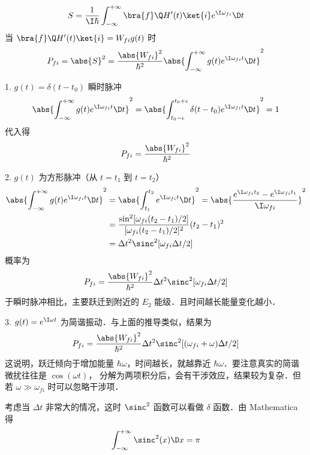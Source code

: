 
\begin{equation}
S = \frac{1}{\I\hbar} \int_{-\infty}^{+\infty} \bra{f}\Q H'(t)\ket{i} e^{\I\omega_{fi}} \D t
\end{equation}
当 $\bra{f}\Q H'(t)\ket{i} = W_{fi} g(t)$ 时
\begin{equation}
P_{fi} = \abs{S}^2 = \frac{\abs{W_{fi}}^2}{\hbar^2} \abs{\int_{-\infty}^{+\infty} g(t) e^{\I\omega_{fi} t} \D t}^2
\end{equation}

1. $g(t) = \delta(t-t_0)$ 瞬时脉冲
\begin{equation}
\abs{\int_{-\infty}^{+\infty} g(t) e^{\I\omega_{fi}t} \D t}^2
= \abs{\int_{t_0-\epsilon}^{t_0+\epsilon} \delta(t-t_0) e^{\I\omega_{fi} t}\D t}^2
= 1
\end{equation}
代入得
\begin{equation}
P_{fi} = \frac{\abs{W_{fi}}^2}{\hbar^2}
\end{equation}


2. $g(t)$ 为方形脉冲（从 $t=t_1$ 到 $t=t_2$）
\begin{equation}\begin{aligned}
\abs{\int_{-\infty}^{+\infty} g(t) e^{\I\omega_{fi}t} \D t}^2
&= \abs{\int_{t_1}^{t_2} e^{\I\omega_{fi}t} \D t}^2
= \abs{\frac{e^{\I\omega_{fi}t_2}-e^{\I\omega_{fi}t_1}}{\I\omega_{fi}}}^2\\
&= \frac{\sin^2[\omega_{fi}(t_2-t_1)/2]}{[\omega_{fi}(t_2-t_1)/2]^2} (t_2-t_1)^2 \\
&= \Delta t^2 \sinc^2[\omega_{fi}\Delta t/2]
\end{aligned}\end{equation}
概率为
\begin{equation}
P_{fi} = \frac{\abs{W_{fi}}^2}{\hbar^2} \Delta t^2 \sinc^2[\omega_{fi}\Delta t/2]
\end{equation}
于瞬时脉冲相比，主要跃迁到附近的 $E_2$ 能级．且时间越长能量变化越小．


3. $g(t)= e^{\I\omega t}$ 为简谐振动．与上面的推导类似，结果为
\begin{equation}
P_{fi} = \frac{\abs{W_{fi}}^2}{\hbar^2} \Delta t^2 \sinc^2[(\omega_{fi}+\omega)\Delta t/2]
\end{equation}
这说明，跃迁倾向于增加能量 $\hbar\omega$，时间越长，就越靠近 $\hbar\omega$．要注意真实的简谐微扰往往是 $\cos(\omega t)$， 分解为两项积分后，会有干涉效应，结果较为复杂．但若 $\omega \gg \omega_{fi}$ 时可以忽略干涉项．

考虑当 $\Delta t$ 非常大的情况，这时 $\sinc^2$ 函数可以看做 $\delta$ 函数．由 Mathematica 得
\begin{equation}
\int_{-\infty}^{+\infty} \sinc^2(x) \D x = \pi
\end{equation}



 

